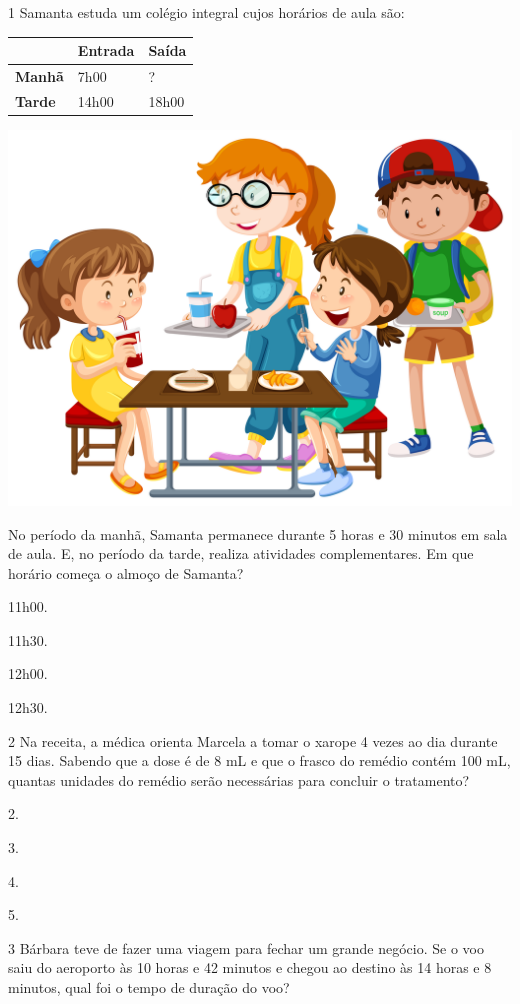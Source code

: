 \num{1} Samanta estuda um colégio integral cujos horários de aula são:  

\begin{longtable}[]{@{}lll@{}}
\toprule
& \textbf{Entrada} & \textbf{Saída}\tabularnewline
\midrule
\endhead
\textbf{Manhã} & 7h00 & ?\tabularnewline
\textbf{Tarde} & 14h00 & 18h00\tabularnewline
\bottomrule
\end{longtable}

\begin{center}
\includegraphics[width=.4\textwidth]{media/image24e.jpeg}
\end{center}

No período da manhã, Samanta permanece durante 5 horas e 30 minutos em sala de aula. 
E, no período da tarde, realiza atividades complementares.
Em que horário começa o almoço de Samanta?

\begin{multicols}{2}
\begin{escolha}
\item
  11h00.
\item
  11h30.
\item
  12h00.
\item
  12h30.
\end{escolha}
\end{multicols}

\num{2} Na receita, a médica orienta Marcela a tomar o xarope 4 vezes ao
dia durante 15 dias. Sabendo que a dose é de 8 mL e que o frasco do remédio
contém 100 mL, quantas unidades do remédio serão necessárias para concluir o 
tratamento? 

\begin{multicols}{2}
\begin{escolha}
\item
  2.
\item
  3.
\item
  4.
\item
  5.
\end{escolha}
\end{multicols}

\num{3} Bárbara teve de fazer uma viagem para fechar um grande negócio. Se o voo
saiu do aeroporto às 10 horas e 42 minutos e chegou ao destino às 14
horas e 8 minutos, qual foi o tempo de duração do voo?

